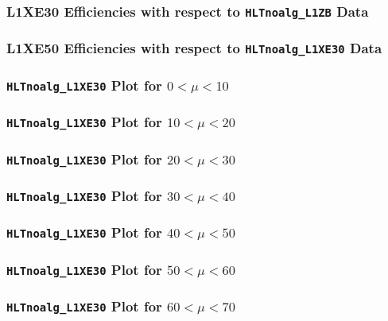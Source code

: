 \documentclass[]{beamer}
\begin{document}
\begin{frame}
        \frametitle{L1XE30 Efficiencies with respect to \texttt{HLTnoalg\_L1ZB} Data}
\end{frame}
\begin{frame}
        \frametitle{L1XE50 Efficiencies with respect to \texttt{HLTnoalg\_L1XE30} Data}
\end{frame}
\begin{frame}
        \frametitle{\texttt{HLTnoalg\_L1XE30} Plot for $0<\mu<10$}
\end{frame}
\begin{frame}
        \frametitle{\texttt{HLTnoalg\_L1XE30} Plot for $10<\mu<20$}
\end{frame}
\begin{frame}
        \frametitle{\texttt{HLTnoalg\_L1XE30} Plot for $20<\mu<30$}
\end{frame}
\begin{frame}
        \frametitle{\texttt{HLTnoalg\_L1XE30} Plot for $30<\mu<40$}
\end{frame}
\begin{frame}
        \frametitle{\texttt{HLTnoalg\_L1XE30} Plot for $40<\mu<50$}
\end{frame}
\begin{frame}
        \frametitle{\texttt{HLTnoalg\_L1XE30} Plot for $50<\mu<60$}
\end{frame}
\begin{frame}
        \frametitle{\texttt{HLTnoalg\_L1XE30} Plot for $60<\mu<70$}
\end{frame}
\end{document}
